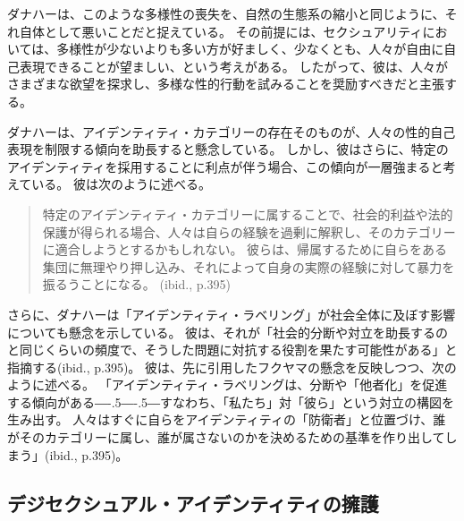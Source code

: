 \documentclass[paper=a4,book,openany]{jlreq}
\def\DDASH{―\kern-.5\zw―\kern-.5\zw―} %
\begin{document}
ダナハーは、このような多様性の喪失を、自然の生態系の縮小と同じように、それ自体として悪いことだと捉えている。
その前提には、セクシュアリティにおいては、多様性が少ないよりも多い方が好ましく、少なくとも、人々が自由に自己表現できることが望ましい、という考えがある。
したがって、彼は、人々がさまざまな欲望を探求し、多様な性的行動を試みることを奨励すべきだと主張する。

ダナハーは、アイデンティティ・カテゴリーの存在そのものが、人々の性的自己表現を制限する傾向を助長すると懸念している。
しかし、彼はさらに、特定のアイデンティティを採用することに利点が伴う場合、この傾向が一層強まると考えている。
彼は次のように述べる。

\begin{quote}
特定のアイデンティティ・カテゴリーに属することで、社会的利益や法的保護が得られる場合、人々は自らの経験を過剰に解釈し、そのカテゴリーに適合しようとするかもしれない。
彼らは、帰属するために自らをある集団に無理やり押し込み、それによって自身の実際の経験に対して暴力を振るうことになる。
(ibid., p.395)

\end{quote}

さらに、ダナハーは「アイデンティティ・ラベリング」が社会全体に及ぼす影響についても懸念を示している。
彼は、それが「社会的分断や対立を助長するのと同じくらいの頻度で、そうした問題に対抗する役割を果たす可能性がある」と指摘する(ibid., p.395)。
彼は、先に引用したフクヤマの懸念を反映しつつ、次のように述べる。
「アイデンティティ・ラベリングは、分断や「他者化」を促進する傾向がある{\DDASH}すなわち、「私たち」対「彼ら」という対立の構図を生み出す。
人々はすぐに自らをアイデンティティの「防衛者」と位置づけ、誰がそのカテゴリーに属し、誰が属さないのかを決めるための基準を作り出してしまう」(ibid., p.395)。

\subsection{デジセクシュアル・アイデンティティの擁護}
\end{document}
